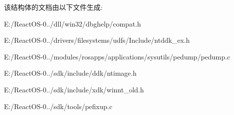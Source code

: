 该结构体的文档由以下文件生成\+:\begin{DoxyCompactItemize}
\item 
E\+:/\+React\+O\+S-\/0../dll/win32/dbghelp/compat.\+h\item 
E\+:/\+React\+O\+S-\/0../drivers/filesystems/udfs/\+Include/ntddk\+\_\+ex.\+h\item 
E\+:/\+React\+O\+S-\/0../modules/rosapps/applications/sysutils/pedump/pedump.\+c\item 
E\+:/\+React\+O\+S-\/0../sdk/include/ddk/ntimage.\+h\item 
E\+:/\+React\+O\+S-\/0../sdk/include/xdk/winnt\+\_\+old.\+h\item 
E\+:/\+React\+O\+S-\/0../sdk/tools/pefixup.\+c\end{DoxyCompactItemize}
